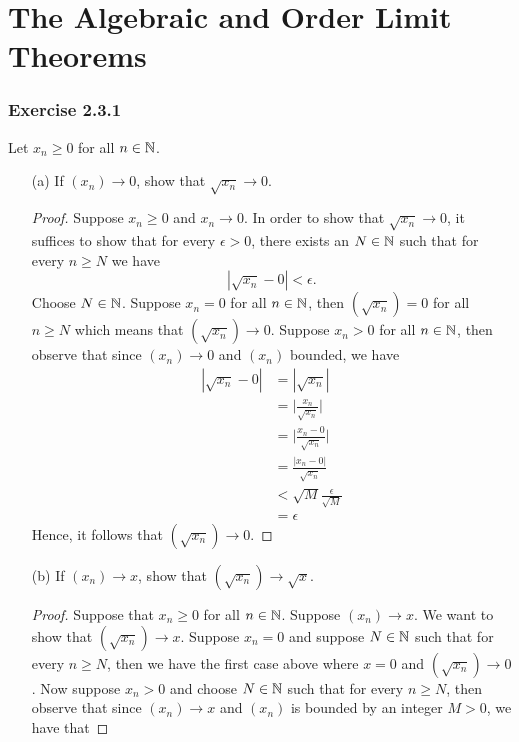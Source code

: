 \section{The Algebraic and Order Limit Theorems}

\subsubsection{Exercise 2.3.1} Let \( x_n \geq 0\) for all \( n \in \mathbb{N} \).

\begin{enumerate}
    \item[(a)] If \( (x_n ) \to 0 \), show that \( \sqrt{x_n} \to 0\).
        \begin{proof}
            Suppose \( x_n \geq 0 \) and \( x_n \to 0\). In order to show that \( \sqrt{x_n} \to 0\), it suffices to show that for every \( \epsilon> 0\), there exists an \( N \in \mathbb{N} \) such that for every \( n \geq N \) we have 
            \[ | \sqrt{x_n} - 0  | < \epsilon.\]
            Choose \( N \in \mathbb{N}\). Suppose \( x_n = 0 \) for all \( n \in \mathbb{N} \), then \( ( \sqrt{x_n}) = 0 \) for all \( n \geq N \) which means that \( ( \sqrt{x_n}) \to 0\). Suppose \( x_n > 0 \) for all \( n \in \mathbb{N}\), then observe that since \( (x_n) \to 0\)  and \( (x_n)\) bounded, we have 
            \begin{align*}
             | \sqrt{x_n} - 0 | &= | \sqrt{x_n} | \\
                            &= \Big| \frac{x_n}{ \sqrt{x_n}} \Big| \\
                            &=  \Big| \frac{x_n - 0}{ \sqrt{x_n}} \Big| \\ 
                            &=  \frac{|x_n - 0|}{ \sqrt{x_n}}  \\
                            &< \sqrt{M} \frac{ \epsilon }{ \sqrt{M} }  \\ 
                            &= \epsilon 
            \end{align*}
            Hence, it follows that \( ( \sqrt{x_n}) \to 0\).
        \end{proof}
    \item[(b)] If \( (x_n) \to x\), show that \( (\sqrt{x_n}) \to \sqrt{x}\).
        \begin{proof}
            Suppose that \( x_n \geq 0\) for all \( n \in \mathbb{N} \). Suppose \( (x_n) \to x \). We want to show that \( ( \sqrt{x_n}) \to x\). Suppose \( x_n = 0 \) and suppose \( N \in \mathbb{N} \) such that for every \( n \geq N \), then we have the first case above where \( x=0\) and \( ( \sqrt{x_n}) \to 0\). Now suppose \( x_n > 0 \) and choose \( N \in \mathbb{N} \) such that for every \( n \geq N \), then observe that since \( (x_n ) \to x \) and \( (x_n)\) is bounded by an integer \( M > 0 \), we have that 


\end{proof}
\end{enumerate}
